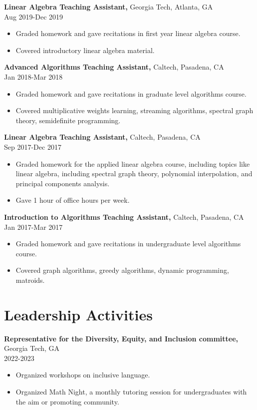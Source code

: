 \documentclass[margin]{res}
\begin{document}
\begin{resume}
{\bf Linear Algebra Teaching Assistant,} Georgia Tech, Atlanta, GA \\ Aug 2019-Dec 2019
\begin{itemize} \itemsep -2pt %
    \item Graded homework and gave recitations in first year linear algebra course.
    \item Covered introductory linear algebra material.
\end{itemize}
 
{\bf Advanced Algorithms Teaching Assistant,} Caltech, Pasadena, CA \\ Jan 2018-Mar 2018
\begin{itemize} \itemsep -2pt %
\item Graded homework and gave recitations in graduate level algorithms course.
\item Covered multiplicative weights learning, streaming algorithms,
spectral graph theory, semidefinite programming.
\end{itemize}
 
{\bf Linear Algebra Teaching Assistant,} Caltech, Pasadena, CA \\ Sep 2017-Dec 2017
\begin{itemize} \itemsep -2pt %
\item Graded homework for the applied linear algebra course, including topics like linear algebra, including spectral graph theory, polynomial
interpolation, and principal components analysis.
\item Gave 1 hour of office hours per week.
\end{itemize}
 
{\bf Introduction to Algorithms Teaching Assistant,} Caltech, Pasadena, CA \\ Jan 2017-Mar 2017
\begin{itemize} \itemsep -2pt %
\item Graded homework and gave recitations in undergraduate level algorithms course.
\item Covered graph algorithms, greedy algorithms, dynamic programming, matroids.
\end{itemize}

\section{Leadership   Activities} 
       {\bf Representative for the Diversity, Equity, and Inclusion committee,} Georgia Tech, GA    \\         2022-2023
        \begin{itemize} \itemsep -2pt
          \item Organized workshops on inclusive language.
          \item Organized Math Night, a monthly tutoring session for undergraduates with the aim or promoting community.
		 \end{itemize}


\end{resume}
\end{document}
